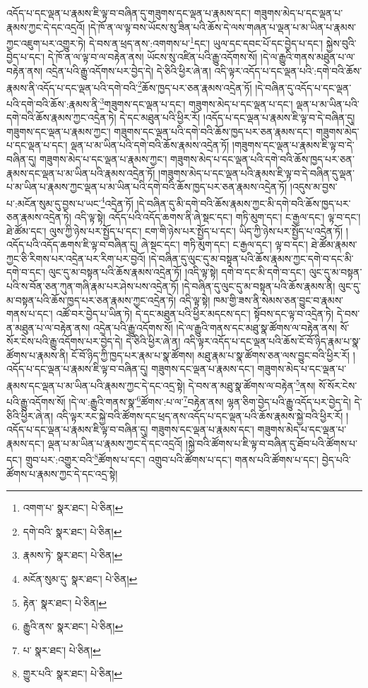 འདོད་པ་དང་ལྡན་པ་རྣམས་ཇི་ལྟ་བ་བཞིན་དུ་གཟུགས་དང་ལྡན་པ་རྣམས་དང་། གཟུགས་མེད་པ་དང་ལྡན་པ་རྣམས་ཀྱང་དེ་དང་འདྲའོ། །དེ་ཁོ་ན་ལ་ལྟ་བས་ཡོངས་སུ་ཟིན་པའི་ཆོས་དེ་ལས་གཞན་པ་ལྡན་པ་མ་ཡིན་པ་རྣམས་ཀྱང་འཇུག་པར་འགྱུར་ཏེ། དེ་བས་ན་ཕྲད་ནས་:འགགས་པ་\footnote{འགག་པ་  སྣར་ཐང་།  པེ་ཅིན། }དང་། ཡུལ་དང་དབང་པོ་དང་བྱེད་པ་དང་། སྐྱེས་བུའི་བྱེད་པ་དང་། དེ་ཁོ་ན་ལ་ལྟ་བ་ལ་བརྟེན་ནས། ཡོངས་སུ་འཛིན་པའི་རྒྱུ་འདོགས་སོ། །དེ་ལ་རྒྱུའི་གནས་མཐུན་པ་ལ་བརྟེན་ནས། འདྲེན་པའི་རྒྱུ་འདོགས་པར་བྱེད་དེ། དེ་ཅིའི་ཕྱིར་ཞེ་ན། འདི་ལྟར་འདོད་པ་དང་ལྡན་པའི་:དགེ་བའི་ཆོས་རྣམས་ནི་འདོད་པ་དང་ལྡན་པའི་དགེ་བའི་\footnote{དགེ་བའི་  སྣར་ཐང་།  པེ་ཅིན། }ཆོས་ཁྱད་པར་ཅན་རྣམས་འདྲེན་ཏོ། །དེ་བཞིན་དུ་འདོད་པ་དང་ལྡན་པའི་དགེ་བའི་ཆོས་:རྣམས་ནི་\footnote{རྣམས་ཏེ་  སྣར་ཐང་།  པེ་ཅིན། }གཟུགས་དང་ལྡན་པ་དང་། གཟུགས་མེད་པ་དང་ལྡན་པ་དང་། ལྡན་པ་མ་ཡིན་པའི་དགེ་བའི་ཆོས་རྣམས་ཀྱང་འདྲེན་ཏེ། དེ་དང་མཐུན་པའི་ཕྱིར་རོ། །འདོད་པ་དང་ལྡན་པ་རྣམས་ཇི་ལྟ་བ་དེ་བཞིན་དུ། གཟུགས་དང་ལྡན་པ་རྣམས་ཀྱང་། གཟུགས་དང་ལྡན་པའི་དགེ་བའི་ཆོས་ཁྱད་པར་ཅན་རྣམས་དང་། གཟུགས་མེད་པ་དང་ལྡན་པ་དང་། ལྡན་པ་མ་ཡིན་པའི་དགེ་བའི་ཆོས་རྣམས་འདྲེན་ཏོ། །གཟུགས་དང་ལྡན་པ་རྣམས་ཇི་ལྟ་བ་དེ་བཞིན་དུ། གཟུགས་མེད་པ་དང་ལྡན་པ་རྣམས་ཀྱང་། གཟུགས་མེད་པ་དང་ལྡན་པའི་དགེ་བའི་ཆོས་ཁྱད་པར་ཅན་རྣམས་དང་ལྡན་པ་མ་ཡིན་པའི་རྣམས་འདྲེན་ཏོ། །གཟུགས་མེད་པ་དང་ལྡན་པའི་རྣམས་ཇི་ལྟ་བ་དེ་བཞིན་དུ་ལྡན་པ་མ་ཡིན་པ་རྣམས་ཀྱང་ལྡན་པ་མ་ཡིན་པའི་དགེ་བའི་ཆོས་ཁྱད་པར་ཅན་རྣམས་འདྲེན་ཏོ། །འདུས་མ་བྱས་པ་:མངོན་སུམ་དུ་བྱས་པ་ཡང་\footnote{མངོན་སུམ་དུ་  སྣར་ཐང་།  པེ་ཅིན། }འདྲེན་ཏོ། །དེ་བཞིན་དུ་མི་དགེ་བའི་ཆོས་རྣམས་ཀྱང་མི་དགེ་བའི་ཆོས་ཁྱད་པར་ཅན་རྣམས་འདྲེན་ཏེ། འདི་ལྟ་སྟེ། འདོད་པའི་འདོད་ཆགས་ནི་ཞེ་སྡང་དང་། གཏི་མུག་དང་། ང་རྒྱལ་དང་། ལྟ་བ་དང་། ཐེ་ཚོམ་དང་། ལུས་ཀྱི་ཉེས་པར་སྤྱོད་པ་དང་། ངག་གི་ཉེས་པར་སྤྱོད་པ་དང་། ཡིད་ཀྱི་ཉེས་པར་སྤྱོད་པ་འདྲེན་ཏོ། །འདོད་པའི་འདོད་ཆགས་ཇི་ལྟ་བ་བཞིན་དུ། ཞེ་སྡང་དང་། གཏི་མུག་དང་། ང་རྒྱལ་དང་། ལྟ་བ་དང་། ཐེ་ཚོམ་རྣམས་ཀྱང་ཅི་རིགས་པར་འདྲེན་པར་རིག་པར་བྱའོ། །དེ་བཞིན་དུ་ལུང་དུ་མ་བསྟན་པའི་ཆོས་རྣམས་ཀྱང་དགེ་བ་དང་མི་དགེ་བ་དང་། ལུང་དུ་མ་བསྟན་པའི་ཆོས་རྣམས་འདྲེན་ཏོ། །འདི་ལྟ་སྟེ། དགེ་བ་དང་མི་དགེ་བ་དང་། ལུང་དུ་མ་བསྟན་པའི་ས་བོན་ཅན་ཀུན་གཞི་རྣམ་པར་ཤེས་པས་འདྲེན་ཏོ། །དེ་བཞིན་དུ་ལུང་དུ་མ་བསྟན་པའི་ཆོས་རྣམས་ནི། ལུང་དུ་མ་བསྟན་པའི་ཆོས་ཁྱད་པར་ཅན་རྣམས་ཀྱང་འདྲེན་ཏེ། འདི་ལྟ་སྟེ། ཁམ་གྱི་ཟས་ནི་སེམས་ཅན་བྱུང་བ་རྣམས་གནས་པ་དང་། འཚོ་བར་བྱེད་པ་ཡིན་ཏེ། དེ་དང་མཐུན་པའི་ཕྱིར་མདངས་དང་། སྟོབས་དང་ལྟ་བ་འདྲེན་ཏེ། དེ་བས་ན་མཐུན་པ་ལ་བརྟེན་ནས། འདྲེན་པའི་རྒྱུ་འདོགས་སོ། །དེ་ལ་རྒྱུའི་གནས་དང་མཐུ་སྣ་ཚོགས་ལ་བརྟེན་ནས། སོ་སོར་ངེས་པའི་རྒྱུ་འདོགས་པར་བྱེད་དེ། དེ་ཅིའི་ཕྱིར་ཞེ་ན། འདི་ལྟར་འདོད་པ་དང་ལྡན་པའི་ཆོས་ངོ་བོ་ཉིད་རྣམ་པ་སྣ་ཚོགས་པ་རྣམས་ནི། ངོ་བོ་ཉིད་ཀྱི་ཁྱད་པར་རྣམ་པ་སྣ་ཚོགས། མཐུ་རྣམ་པ་སྣ་ཚོགས་ཅན་ལས་བྱུང་བའི་ཕྱིར་རོ། །འདོད་པ་དང་ལྡན་པ་རྣམས་ཇི་ལྟ་བ་བཞིན་དུ། གཟུགས་དང་ལྡན་པ་རྣམས་དང་། གཟུགས་མེད་པ་དང་ལྡན་པ་རྣམས་དང་ལྡན་པ་མ་ཡིན་པའི་རྣམས་ཀྱང་དེ་དང་འདྲ་སྟེ། དེ་བས་ན་མཐུ་སྣ་ཚོགས་ལ་བརྟེན་\footnote{རྟེན་  སྣར་ཐང་།  པེ་ཅིན། }ནས། སོ་སོར་ངེས་པའི་རྒྱུ་འདོགས་སོ། །དེ་ལ་:རྒྱུའི་གནས་སྣ་\footnote{རྒྱུའི་ནས་  སྣར་ཐང་།  པེ་ཅིན། }ཚོགས་:པ་ལ་\footnote{པ་  སྣར་ཐང་།  པེ་ཅིན། }བརྟེན་ནས། ལྷན་ཅིག་བྱེད་པའི་རྒྱུ་འདོད་པར་བྱེད་དེ། དེ་ཅིའི་ཕྱིར་ཞེ་ན། འདི་ལྟར་རང་སྐྱེ་བའི་ཚོགས་དང་ཕྲད་ནས་འདོད་པ་དང་ལྡན་པའི་ཆོས་རྣམས་སྐྱེ་བའི་ཕྱིར་རོ། །འདོད་པ་དང་ལྡན་པ་རྣམས་ཇི་ལྟ་བ་བཞིན་དུ། གཟུགས་དང་ལྡན་པ་རྣམས་དང་། གཟུགས་མེད་པ་དང་ལྡན་པ་རྣམས་དང་། ལྡན་པ་མ་ཡིན་པ་རྣམས་ཀྱང་དེ་དང་འདྲའོ། །སྐྱེ་བའི་ཚོགས་པ་ཇི་ལྟ་བ་བཞིན་དུ་ཐོབ་པའི་ཚོགས་པ་དང་། གྲུབ་པར་:འགྱུར་བའི་\footnote{གྱུར་པའི་  སྣར་ཐང་།  པེ་ཅིན། }ཚོགས་པ་དང་། འགྲུབ་པའི་ཚོགས་པ་དང་། གནས་པའི་ཚོགས་པ་དང་། བྱེད་པའི་ཚོགས་པ་རྣམས་ཀྱང་དེ་དང་འདྲ་སྟེ། 